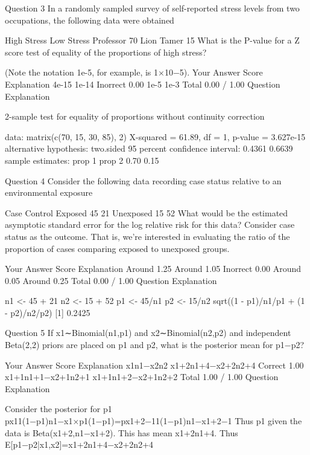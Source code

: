 
Question 3
In a randomly sampled survey of self-reported stress levels from two occupations, the following data were obtained

High Stress	Low Stress
Professor	70
Lion Tamer	15
What is the P-value for a Z score test of equality of the proportions of high stress?

(Note the notation 1e-5, for example, is 1×10−5).
Your Answer		Score	Explanation
4e-15			
1e-14	Inorrect	0.00	
1e-5			
1e-3			
Total		0.00 / 1.00	
Question Explanation


    2-sample test for equality of proportions without continuity
    correction

data:  matrix(c(70, 15, 30, 85), 2) 
X-squared = 61.89, df = 1, p-value = 3.627e-15
alternative hypothesis: two.sided 
95 percent confidence interval:
 0.4361 0.6639 
sample estimates:
prop 1 prop 2 
  0.70   0.15 
  
  
Question 4
Consider the following data recording case status relative to an environmental exposure

Case	Control
Exposed	45	21
Unexposed	15	52
What would be the estimated asymptotic standard error for the log relative risk for this data? Consider case status as the outcome. That is, we're interested in evaluating the ratio of the proportion of cases comparing exposed to unexposed groups.

Your Answer		Score	Explanation
Around 1.25			
Around 1.05	Inorrect	0.00	
Around 0.05			
Around 0.25			
Total		0.00 / 1.00	
Question Explanation

n1 <- 45 + 21
n2 <- 15 + 52
p1 <- 45/n1
p2 <- 15/n2
sqrt((1 - p1)/n1/p1 + (1 - p2)/n2/p2)
[1] 0.2425


Question 5
If x1∼Binomial(n1,p1) and x2∼Binomial(n2,p2) and independent Beta(2,2) priors are placed on p1 and p2, what is the posterior mean for p1−p2?

Your Answer		Score	Explanation
x1n1−x2n2			
x1+2n1+4−x2+2n2+4	Correct	1.00	
x1+1n1+1−x2+1n2+1			
x1+1n1+2−x2+1n2+2			
Total		1.00 / 1.00	
Question Explanation

Consider the posterior for p1
px11(1−p1)n1−x1×p1(1−p1)=px1+2−11(1−p1)n1−x1+2−1
Thus p1 given the data is Beta(x1+2,n1−x1+2). This has mean x1+2n1+4. Thus
E[p1−p2|x1,x2]=x1+2n1+4−x2+2n2+4

